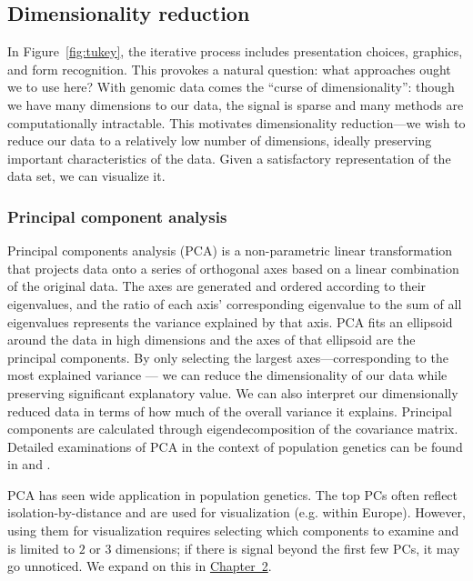 \subsection{Dimensionality reduction}

In Figure~\ref{fig:tukey}, the iterative process includes presentation choices, graphics, and form recognition. This provokes a natural question: what approaches ought we to use here? With genomic data comes the ``curse of dimensionality'': though we have many dimensions to our data, the signal is sparse and many methods are computationally intractable. This motivates dimensionality reduction---we wish to reduce our data to a relatively low number of dimensions, ideally preserving important characteristics of the data. Given a satisfactory representation of the data set, we can visualize it.

\subsubsection{Principal component analysis}
Principal components analysis (PCA) is a non-parametric linear transformation that projects data onto a series of orthogonal axes based on a linear combination of the original data. The axes are generated and ordered according to their eigenvalues, and the ratio of each axis' corresponding eigenvalue to the sum of all eigenvalues represents the variance explained by that axis. PCA fits an ellipsoid around the data in high dimensions and the axes of that ellipsoid are the principal components. By only selecting the largest axes---corresponding to the most explained variance --- we can reduce the dimensionality of our data while preserving significant explanatory value. We can also interpret our dimensionally reduced data in terms of how much of the overall variance it explains. Principal components are calculated through eigendecomposition of the covariance matrix. Detailed examinations of PCA in the context of population genetics can be found in \cite{peter_geometric_2022} and \citep{mcvean_genealogical_2009}.

PCA has seen wide application in population genetics. The top PCs often reflect isolation-by-distance and are used for visualization (e.g. within Europe\citep{novembre2008europe}). However, using them for visualization requires selecting which components to examine and is limited to $2$ or $3$ dimensions; if there is signal beyond the first few PCs, it may go unnoticed. We expand on this in \hyperref[chap:chapter2]{Chapter~2}.

